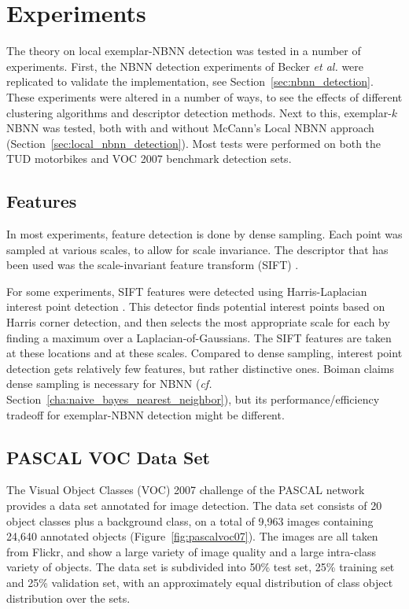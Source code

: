 \chapter{Experiments} %
\label{cha:experimental_setup}

The theory on local exemplar-NBNN detection was tested in a number of experiments. First, the NBNN detection experiments of Becker \emph{et al.} \cite{becker2012codebook} were replicated to validate the implementation, see Section~\ref{sec:nbnn_detection}. These experiments were altered in a number of ways, to see the effects of different clustering algorithms and descriptor detection methods. Next to this, exemplar-$k$NBNN was tested, both with and without McCann's Local NBNN approach (Section~\ref{sec:local_nbnn_detection}). Most tests were performed on both the TUD motorbikes and VOC 2007 benchmark detection sets.

\section{Features} %
\label{sec:features}

In most experiments, feature detection is done by dense sampling. Each point was sampled at various scales, to allow for scale invariance. The descriptor that has been used was the scale-invariant feature transform (SIFT) \cite{lowe2004distinctive}.

For some experiments, SIFT features were detected using Harris-Laplacian interest point detection \cite{mikolajczyk2005comparison, vandeSande2010colorSIFT}. This detector finds potential interest points based on Harris corner detection, and then selects the most appropriate scale for each by finding a maximum over a Laplacian-of-Gaussians. The SIFT features are taken at these locations and at these scales. Compared to dense sampling, interest point detection gets relatively few features, but rather distinctive ones. Boiman claims dense sampling is necessary for NBNN (\emph{cf.} Section~\ref{cha:naive_bayes_nearest_neighbor}), but its performance/efficiency tradeoff for exemplar-NBNN detection might be different.


\section{PASCAL VOC Data Set} %

\label{sec:voc_data_set}
The Visual Object Classes (VOC) 2007 challenge of the PASCAL network \cite{pascal-voc-2007} provides a data set annotated for image detection. The data set consists of 20 object classes plus a background class, on a total of 9,963 images containing 24,640 annotated objects (Figure~\ref{fig:pascalvoc07}). The images are all taken from Flickr, and show a large variety of image quality and a large intra-class variety of objects. The data set is subdivided into 50\% test set, 25\% training set and 25\% validation set, with an approximately equal distribution of class object distribution over the sets.

